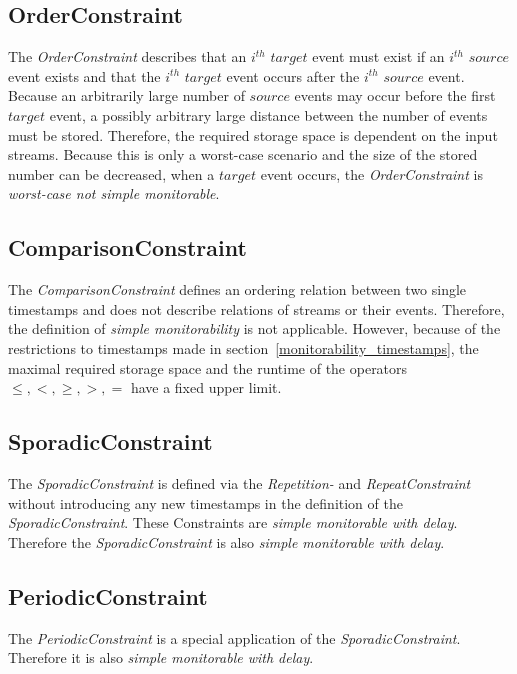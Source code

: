 \subsection{OrderConstraint}
	The \emph{OrderConstraint} describes that an $i^{th}$ $target$ event must exist if an $i^{th}$ $source$ event exists and that the $i^{th}$ $target$ event occurs after the $i^{th}$ $source$ event.  Because an arbitrarily large number of $source$ events may occur before the first $target$ event, a possibly arbitrary large distance between the number of events must be stored. Therefore, the required storage space is dependent on the input streams.  Because this is only a worst-case scenario and the size of the stored number can be decreased, when a $target$ event occurs, the \emph{OrderConstraint} is \textit{worst-case not simple monitorable}.
	
\subsection{ComparisonConstraint}
	The \textit{ComparisonConstraint} defines an ordering relation between two single timestamps and does not describe relations of streams or their events. Therefore, the definition of \textit{simple monitorability} is not applicable. However, because of the restrictions to timestamps made in section~\ref{monitorability_timestamps}, the maximal required storage space and the runtime of the operators $\leq, <, \geq, >, =$ have a fixed upper limit.
	
\subsection{SporadicConstraint}
	The \emph{SporadicConstraint} is defined via the \emph{Repetition-} and \emph{RepeatConstraint} without introducing any new timestamps in the definition of the \emph{SporadicConstraint}. These Constraints are \textit{simple monitorable with delay}. Therefore the \emph{SporadicConstraint} is also \textit{simple monitorable with delay}.
	
\subsection{PeriodicConstraint}
	The \emph{PeriodicConstraint} is a special application of the \emph{SporadicConstraint}. Therefore it is also \textit{simple monitorable with delay}.
	
